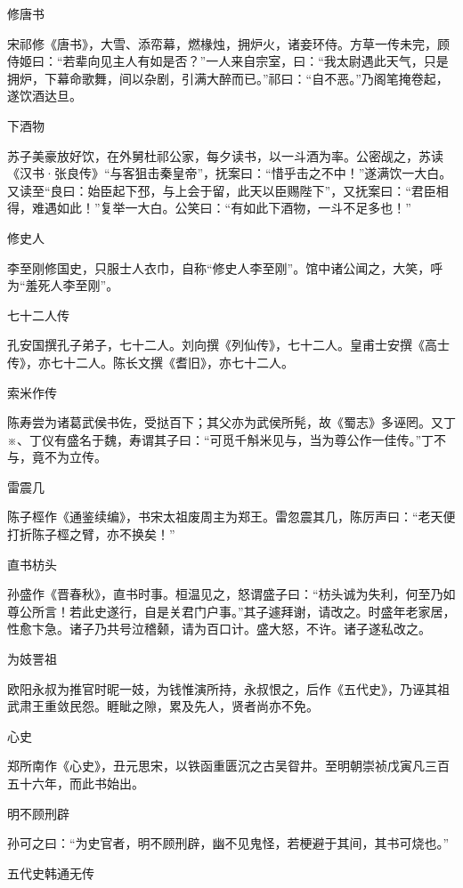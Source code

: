 \documentclass[a4paper,12pt,UTF8,twoside]{ctexbook}
\begin{document}
    修唐书
    
    宋祁修《唐书》，大雪、添帟幕，燃椽烛，拥炉火，诸妾环侍。方草一传未完，顾侍姬曰：“若辈向见主人有如是否？”一人来自宗室，曰：“我太尉遇此天气，只是拥炉，下幕命歌舞，间以杂剧，引满大醉而已。”祁曰：“自不恶。”乃阁笔掩卷起，遂饮酒达旦。
    
    下酒物
    
    苏子美豪放好饮，在外舅杜祁公家，每夕读书，以一斗酒为率。公密觇之，苏读《汉书·张良传》“与客狙击秦皇帝”，抚案曰：“惜乎击之不中！”遂满饮一大白。又读至“良曰：始臣起下邳，与上会于留，此天以臣赐陛下”，又抚案曰：“君臣相得，难遇如此！”复举一大白。公笑曰：“有如此下酒物，一斗不足多也！”
    
    修史人
    
    李至刚修国史，只服士人衣巾，自称“修史人李至刚”。馆中诸公闻之，大笑，呼为“羞死人李至刚”。
    
    七十二人传
    
    孔安国撰孔子弟子，七十二人。刘向撰《列仙传》，七十二人。皇甫士安撰《高士传》，亦七十二人。陈长文撰《耆旧》，亦七十二人。
    
    索米作传
    
    陈寿尝为诸葛武侯书佐，受挞百下；其父亦为武侯所髡，故《蜀志》多诬罔。又丁※、丁仪有盛名于魏，寿谓其子曰：“可觅千斛米见与，当为尊公作一佳传。”丁不与，竟不为立传。
    
    雷震几
    
    陈子桱作《通鉴续编》，书宋太祖废周主为郑王。雷忽震其几，陈厉声曰：“老天便打折陈子桱之臂，亦不换矣！”
    
    直书枋头
    
    孙盛作《晋春秋》，直书时事。桓温见之，怒谓盛子曰：“枋头诚为失利，何至乃如尊公所言！若此史遂行，自是关君门户事。”其子遽拜谢，请改之。时盛年老家居，性愈卞急。诸子乃共号泣稽颡，请为百口计。盛大怒，不许。诸子遂私改之。
    
    为妓詈祖
    
    欧阳永叔为推官时昵一妓，为钱惟演所持，永叔恨之，后作《五代史》，乃诬其祖武肃王重敛民怨。睚眦之隙，累及先人，贤者尚亦不免。
    
    心史
    
    郑所南作《心史》，丑元思宋，以铁函重匮沉之古吴眢井。至明朝崇祯戊寅凡三百五十六年，而此书始出。
    
    明不顾刑辟
    
    孙可之曰：“为史官者，明不顾刑辟，幽不见鬼怪，若梗避于其间，其书可烧也。”
    
    五代史韩通无传
    
\end{document}
